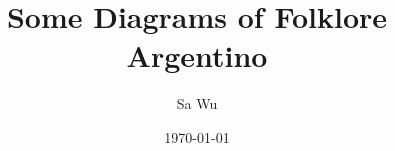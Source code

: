 

\renewcommand{\arrowlength}{2mm}
\renewcommand{\arrowwidth}{2mm}
\renewcommand{\nodesize}{4mm}
\renewcommand{\colora}{green}
\renewcommand{\colorb}{blue}

\newcommand{\afourth}{.24}
\newcommand{\athird}{.325}
\newcommand{\ahalf}{.48}
\newcommand{\scalethree}{0.33}
\newcommand{\scalefour}{0.25}

\title{Some Diagrams of Folklore Argentino}
\author{Sa Wu}
\date{\today}



\maketitle

\clearpage

\begin{cuadrodebaile}[scale=1.]
	\primeracolocacionb[draw]
	\giros
\end{cuadrodebaile}

\begin{cuadrodebaile}[scale=1./2]
	\segundacolocacionbr[draw]
	\giros
\end{cuadrodebaile}
\begin{cuadrodebaile}[scale=1./2]
	\segundacolocacionbl[draw]
	\giros
\end{cuadrodebaile}

\begin{cuadrodebaile}[scale=1./3]
	\primeracolocacionl[draw]
	\giros
\end{cuadrodebaile}
\begin{cuadrodebaile}[scale=1./3]
	\primeracolocaciont[draw]
	\giros
\end{cuadrodebaile}
\begin{cuadrodebaile}[scale=1./3]
	\primeracolocacionr[draw]
	\giros
\end{cuadrodebaile}

\begin{cuadrodebaile}[scale=1./4]
	\segundacolocaciontl[draw]
	\giros
\end{cuadrodebaile}
\begin{cuadrodebaile}[scale=1./4]
	\segundacolocaciontr[draw]
	\giros
\end{cuadrodebaile}
\begin{cuadrodebaile}[scale=1./4]
	\segundacolocacionbr[draw]
	\giros
\end{cuadrodebaile}
\begin{cuadrodebaile}[scale=1./4]
	\segundacolocacionbl[draw]
	\giros
\end{cuadrodebaile}

